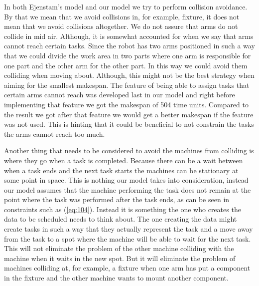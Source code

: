 In both Ejenstam's model and our model we try to perform collision avoidance. By that we mean that we avoid collisions in, for example, fixture, it does not mean that we avoid collisions altogether. We do not assure that arms do not collide in mid air. Although, it is somewhat accounted for when we say that arms cannot reach certain tasks. Since the robot has two arms positioned in such a way that we could divide the work area in two parts where one arm is responsible for one part and the other arm for the other part. In this way we could avoid them colliding when moving about. Although, this might not be the best strategy when aiming for the smallest makespan. The feature of being able to assign tasks that certain arms cannot reach was developed last in our model and right before implementing that feature we got the makespan of 504 time units. Compared to the result we got after that feature we would get a better makespan if the feature was not used. This is hinting that it could be beneficial to not constrain the tasks the arms cannot reach too much.

Another thing that needs to be considered to avoid the machines from colliding is where they go when a task is completed. Because there can be a wait between when a task ends and the next task starts the machines can be stationary at some point in space. This is nothing our model takes into consideration, instead our model assumes that the machine performing the task does not remain at the point where the task was performed after the task ends, as can be seen in constraints such as (\ref{eq:104}). Instead it is something the one who creates the data to be scheduled needs to think about. The one creating the data might create tasks in such a way that they actually represent the task and a move away from the task to a spot where the machine will be able to wait for the next task. This will not eliminate the problem of the other machine colliding with the machine when it waits in the new spot. But it will eliminate the problem of machines colliding at, for example, a fixture when one arm has put a component in the fixture and the other machine wants to mount another component.

